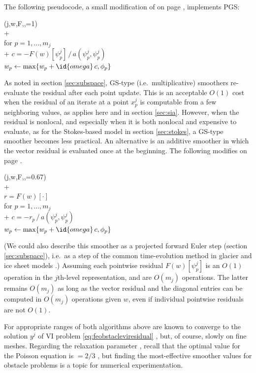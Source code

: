 \documentclass[letterpaper,final,12pt,reqno]{amsart}
\theoremstyle{claim}
\numberwithin{equation}{section}
\numberwithin{figure}{section}
\numberwithin{table}{section}
\numberwithin{theorem}{section}
\begin{document}
The following pseudocode, a small modification of  on page \pageref{ps:gs-sweep}, implements PGS:
\begin{pseudo*} \label{ps:pgs}
(j,w,F,\phi,=1)\text{:} \\+
     \\
    for $p=1,\dots,m_j$ \\+
        $c = -F(w)[\psi_p^j] \,\big/\, a(\psi_p^j,\psi_p^j)$ \\
        $w_p \gets \max\{w_p + \id{omega}\,c, \phi_p\}$
\end{pseudo*}

As noted in section \ref{sec:subspace}, GS-type (i.e.~multiplicative) smoothers re-evaluate the residual after each point update.  This is an acceptable $O(1)$ cost when the residual of an iterate at a point $x_p^j$ is computable from a few neighboring values, as applies here and in section \ref{sec:sia}.  However, when the residual is nonlocal, and especially when it is both nonlocal and expensive to evaluate, as for the Stokes-based model in section \ref{sec:stokes}, a GS-type smoother becomes less practical.  An alternative is an additive smoother in which the vector residual is evaluated once at the beginning.  The following modifies  on page \pageref{ps:jacobi-sweep}.
\begin{pseudo*} \label{ps:pjacobi}
(j,w,F,\phi,=0.67)\text{:} \\+
     \\
    $r = F(w)[\cdot]$ \\
    for $p=1,\dots,m_j$ \\+
        $c = -r_p \,\big/\, a(\psi_p^j,\psi_p^j)$ \\
        $w_p \gets \max\{w_p + \id{omega}\,c, \phi_p\}$
\end{pseudo*}
(We could also describe this smoother as a projected forward Euler step (section \ref{sec:subspace}), i.e.~as a step of the common time-evolution method in glacier and ice sheet models \cite[for example]{Winkelmannetal2011}.)  Assuming each pointwise residual $F(w)[\psi_p^j]$ is an $O(1)$ operation in the $j$th-level representation,  and  are $O(m_j)$ operations.  The latter remains $O(m_j)$ as long as the vector residual and the diagonal entries can be computed in $O(m_j)$ operations given $w$, even if individual pointwise residuals are not $O(1)$.

For appropriate ranges of  both algorithms above are known to converge to the solution $y^j$ of VI problem \eqref{eq:feobstacleviresidual} \cite[Proposition 4.5]{GraeserKornhuber2009}, but, of course, slowly on fine meshes.  Regarding the relaxation parameter , recall that the optimal value for the Poisson equation is  $=2/3$ \cite{Briggsetal2000}, but finding the most-effective smoother values for obstacle problems is a topic for numerical experimentation.
\end{document}
